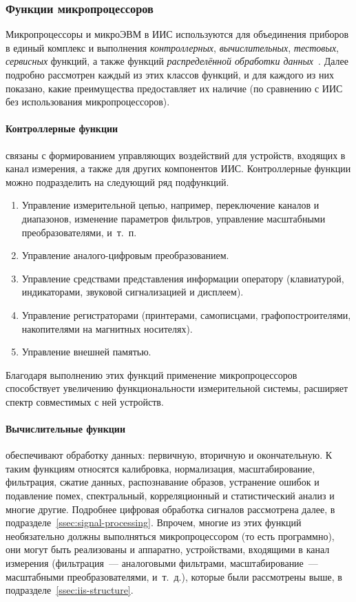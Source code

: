\documentclass[a4paper, 14pt, titlepage]{extarticle}
\newcommand{\term}[1]{\emph{#1}}
\let\oldparagraph\paragraph
\renewcommand{\paragraph}[1]{\oldparagraph{\indent #1}}
\begin{document}
  \subsubsection{Функции микропроцессоров}

  Микропроцессоры и микроЭВМ в ИИС используются для объединения приборов в единый комплекс и выполнения
  \term{контроллерных}, \term{вычислительных}, \term{тестовых}, \term{сервисных} функций, а также
  функций \term{распределённой обработки данных}~\cite[с.~421]{rannev-meas-tech}.
  Далее подробно рассмотрен каждый из этих классов функций, и для каждого из них показано, какие
  преимущества предоставляет их наличие (по сравнению с ИИС без использования микропроцессоров).

  \paragraph{Контроллерные функции} связаны с формированием управляющих воздействий для устройств,
  входящих в канал измерения, а также для других компонентов ИИС. Контроллерные функции можно
  подразделить на следующий ряд подфункций.
  \begin{enumerate}
    \item Управление измерительной цепью, например, переключение каналов и диапазонов, изменение
      параметров фильтров, управление масштабными преобразователями, и~т.~п.
    \item Управление аналого-цифровым преобразованием.
    \item Управление средствами представления информации оператору (клавиатурой, индикаторами,
      звуковой сигнализацией и дисплеем).
    \item Управление регистраторами (принтерами, самописцами, графопостроителями,
      накопителями на магнитных носителях).
    \item Управление внешней памятью.
  \end{enumerate}

  Благодаря выполнению этих функций применение микропроцессоров способствует увеличению
  функциональности измерительной системы, расширяет спектр совместимых с ней устройств.

  \paragraph{Вычислительные функции} обеспечивают обработку данных: первичную, вторичную и
  окончательную. К таким функциям относятся калибровка, нормализация, масштабирование, фильтрация,
  сжатие данных, распознавание образов, устранение ошибок и подавление помех, спектральный,
  корреляционный и статистический анализ и многие другие. Подробнее цифровая обработка сигналов
  рассмотрена далее, в подразделе~\ref{ssec:signal-processing}. Впрочем, многие из этих функций
  необязательно должны выполняться микропроцессором (то есть программно), они могут быть реализованы
  и аппаратно, устройствами, входящими в канал измерения (фильтрация~--- аналоговыми фильтрами,
  масштабирование~--- масштабными преобразователями, и~т.~д.), которые были рассмотрены выше, в
  подразделе~\ref{ssec:iis-structure}.
\end{document}
